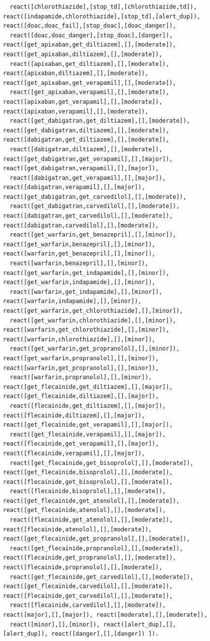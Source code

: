 \begin{figure}[t]
\begin{verbatim}
  react([chlorothiazide],[stop_td],[chlorothiazide,td]), react([indapamide,chlorothiazide],[stop_td],[alert_dup]), react([doac,doac_fail],[stop_doac],[doac_danger]),
  react([doac,doac_danger],[stop_doac],[danger]), react([get_apixaban,get_diltiazem],[],[moderate]), react([get_apixaban,diltiazem],[],[moderate]),
  react([apixaban,get_diltiazem],[],[moderate]), react([apixaban,diltiazem],[],[moderate]), react([get_apixaban,get_verapamil],[],[moderate]),
  react([get_apixaban,verapamil],[],[moderate]), react([apixaban,get_verapamil],[],[moderate]), react([apixaban,verapamil],[],[moderate]),
  react([get_dabigatran,get_diltiazem],[],[moderate]), react([get_dabigatran,diltiazem],[],[moderate]), react([dabigatran,get_diltiazem],[],[moderate]),
  react([dabigatran,diltiazem],[],[moderate]), react([get_dabigatran,get_verapamil],[],[major]), react([get_dabigatran,verapamil],[],[major]),
  react([dabigatran,get_verapamil],[],[major]), react([dabigatran,verapamil],[],[major]), react([get_dabigatran,get_carvedilol],[],[moderate]),
  react([get_dabigatran,carvedilol],[],[moderate]), react([dabigatran,get_carvedilol],[],[moderate]), react([dabigatran,carvedilol],[],[moderate]), 
  react([get_warfarin,get_benazepril],[],[minor]), react([get_warfarin,benazepril],[],[minor]), react([warfarin,get_benazepril],[],[minor]),
  react([warfarin,benazepril],[],[minor]), react([get_warfarin,get_indapamide],[],[minor]), react([get_warfarin,indapamide],[],[minor]),
  react([warfarin,get_indapamide],[],[minor]), react([warfarin,indapamide],[],[minor]), react([get_warfarin,get_chlorothiazide],[],[minor]),
  react([get_warfarin,chlorothiazide],[],[minor]), react([warfarin,get_chlorothiazide],[],[minor]), react([warfarin,chlorothiazide],[],[minor]),
  react([get_warfarin,get_propranolol],[],[minor]), react([get_warfarin,propranolol],[],[minor]), react([warfarin,get_propranolol],[],[minor]),
  react([warfarin,propranolol],[],[minor]), react([get_flecainide,get_diltiazem],[],[major]), react([get_flecainide,diltiazem],[],[major]),
  react([flecainide,get_diltiazem],[],[major]), react([flecainide,diltiazem],[],[major]), react([get_flecainide,get_verapamil],[],[major]),
  react([get_flecainide,verapamil],[],[major]), react([flecainide,get_verapamil],[],[major]), react([flecainide,verapamil],[],[major]), 
  react([get_flecainide,get_bisoprolol],[],[moderate]), react([get_flecainide,bisoprolol],[],[moderate]), react([flecainide,get_bisoprolol],[],[moderate]),
  react([flecainide,bisoprolol],[],[moderate]), react([get_flecainide,get_atenolol],[],[moderate]), react([get_flecainide,atenolol],[],[moderate]), 
  react([flecainide,get_atenolol],[],[moderate]), react([flecainide,atenolol],[],[moderate]), react([get_flecainide,get_propranolol],[],[moderate]),
  react([get_flecainide,propranolol],[],[moderate]), react([flecainide,get_propranolol],[],[moderate]), react([flecainide,propranolol],[],[moderate]), 
  react([get_flecainide,get_carvedilol],[],[moderate]), react([get_flecainide,carvedilol],[],[moderate]), react([flecainide,get_carvedilol],[],[moderate]),
  react([flecainide,carvedilol],[],[moderate]), react([major],[],[major]), react([moderate],[],[moderate]),
  react([minor],[],[minor]), react([alert_dup],[],[alert_dup]), react([danger],[],[danger]) ]).


\end{verbatim}
\end{figure}
